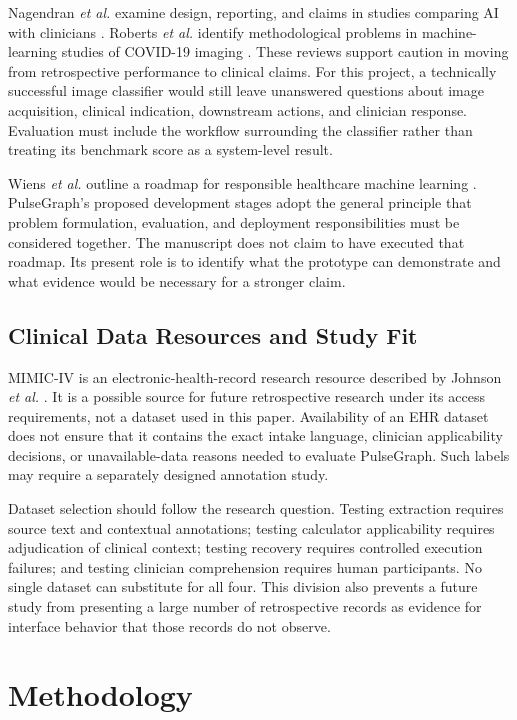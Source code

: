 \documentclass[conference]{IEEEtran}
\begin{document}
Nagendran \emph{et al.} examine design, reporting, and claims in studies comparing AI with clinicians \cite{nagendran}. Roberts \emph{et al.} identify methodological problems in machine-learning studies of COVID-19 imaging \cite{roberts}. These reviews support caution in moving from retrospective performance to clinical claims. For this project, a technically successful image classifier would still leave unanswered questions about image acquisition, clinical indication, downstream actions, and clinician response. Evaluation must include the workflow surrounding the classifier rather than treating its benchmark score as a system-level result.

Wiens \emph{et al.} outline a roadmap for responsible healthcare machine learning \cite{wiens}. PulseGraph's proposed development stages adopt the general principle that problem formulation, evaluation, and deployment responsibilities must be considered together. The manuscript does not claim to have executed that roadmap. Its present role is to identify what the prototype can demonstrate and what evidence would be necessary for a stronger claim.

\subsection{Clinical Data Resources and Study Fit}
MIMIC-IV is an electronic-health-record research resource described by Johnson \emph{et al.} \cite{mimic}. It is a possible source for future retrospective research under its access requirements, not a dataset used in this paper. Availability of an EHR dataset does not ensure that it contains the exact intake language, clinician applicability decisions, or unavailable-data reasons needed to evaluate PulseGraph. Such labels may require a separately designed annotation study.

Dataset selection should follow the research question. Testing extraction requires source text and contextual annotations; testing calculator applicability requires adjudication of clinical context; testing recovery requires controlled execution failures; and testing clinician comprehension requires human participants. No single dataset can substitute for all four. This division also prevents a future study from presenting a large number of retrospective records as evidence for interface behavior that those records do not observe.

\section{Methodology}
\end{document}

